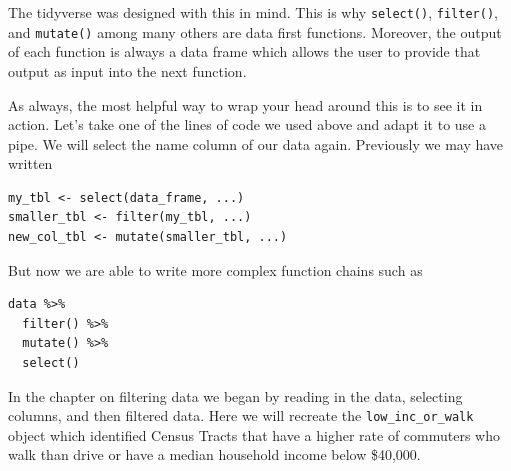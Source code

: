 \documentclass[
]{book}
\begin{document}
The tidyverse was designed with this in mind. This is why \texttt{select()}, \texttt{filter()}, and \texttt{mutate()} among many others are data first functions. Moreover, the output of each function is always a data frame which allows the user to provide that output as input into the next function.

As always, the most helpful way to wrap your head around this is to see it in action. Let's take one of the lines of code we used above and adapt it to use a pipe. We will select the name column of our data again. Previously we may have written

\begin{verbatim}
my_tbl <- select(data_frame, ...)
smaller_tbl <- filter(my_tbl, ...)
new_col_tbl <- mutate(smaller_tbl, ...)
\end{verbatim}

But now we are able to write more complex function chains such as

\begin{verbatim}
data %>% 
  filter() %>% 
  mutate() %>% 
  select()
\end{verbatim}

In the chapter on filtering data we began by reading in the data, selecting columns, and then filtered data. Here we will recreate the \texttt{low\_inc\_or\_walk} object which identified Census Tracts that have a higher rate of commuters who walk than drive or have a median household income below \$40,000.
\end{document}
